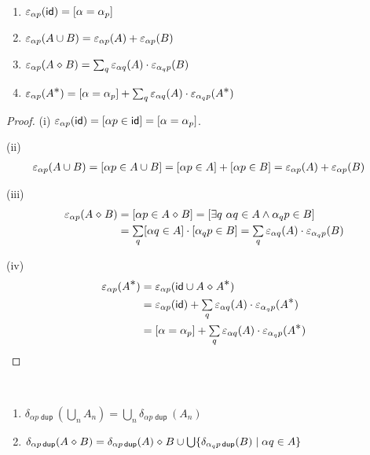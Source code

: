 \documentclass{article}
\renewcommand\smash{\mathrel{\diamond}}
\newcommand\ssum{\mathop{\textstyle\sum}}
\newcommand\pdup{\mathop{\mathsf{dup}}}
\newcommand\bval[1]{[#1]}
\renewcommand\star{^{\textstyle *}}
\newcommand\id{\mathsf{id}}
\newcommand\sbigcup{\mathop{\textstyle\bigcup}}
\begin{document}
\begin{lemma}\ 
\begin{enumerate}
\romanize
\item
$\eps_{\alpha p}(\id) = \bval{\alpha=\alpha_p}$
\item
$\varepsilon_{\alpha p}(A\cup B) = \varepsilon_{\alpha p}(A) + \varepsilon_{\alpha p}(B)$
\item
$\eps_{\alpha p}(A\smash B) = \ssum_q\eps_{\alpha q}(A)\cdot\eps_{\alpha_q p}(B)$
\item
$\eps_{\alpha p}(A\star) = \bval{\alpha = \alpha_p} + \ssum_q\eps_{\alpha q}(A)\cdot\eps_{\alpha_q p}(A\star)$
\end{enumerate}
\end{lemma}

\begin{proof}
(i) $\eps_{\alpha p}(\id) = \bval{\alpha p\in\id} = \bval{\alpha=\alpha_p}$.

(ii)
\begin{align*}
\eps_{\alpha p}(A\cup B)
&= \bval{\alpha p\in A\cup B}
= \bval{\alpha p\in A}
+ \bval{\alpha p\in B}
= \eps_{\alpha p}(A)
+ \eps_{\alpha p}(B)
\end{align*}

(iii)
\begin{align*}
\eps_{\alpha p}(A\smash B)
&= \bval{\alpha p\in A\smash B}
= \bval{\exists q\ \alpha q\in A\meet \alpha_q p\in B}\\
&= \ssum_q \bval{\alpha q\in A}
\cdot
\bval{\alpha_q p\in B}
= \ssum_q\eps_{\alpha q}(A)\cdot\eps_{\alpha_q p}(B)
\end{align*}

(iv)
\begin{align*}
\eps_{\alpha p}(A\star)
&= \eps_{\alpha p}(\id\cup A\smash A\star)\\
&= \eps_{\alpha p}(\id) + \ssum_q\eps_{\alpha q}(A)\cdot\eps_{\alpha_q p}(A\star)\\
&= \bval{\alpha = \alpha_p}
+ \ssum_q\eps_{\alpha q}(A)\cdot\eps_{\alpha_q p}(A\star)
\end{align*}
\end{proof}

\begin{lemma}\ 
\begin{enumerate}
\romanize
\item
$\delta_{\alpha p\pdup}(\sbigcup_n A_n) = \sbigcup_n \delta_{\alpha p\pdup}(A_n)$
\item
$\delta_{\alpha p\pdup}(A\smash B) = \delta_{\alpha p\pdup}(A)\smash B \cup \sbigcup \set{\delta_{\alpha_q p\pdup}(B)}{\alpha q\in A}$
\end{enumerate}
\end{lemma}
\end{document}

